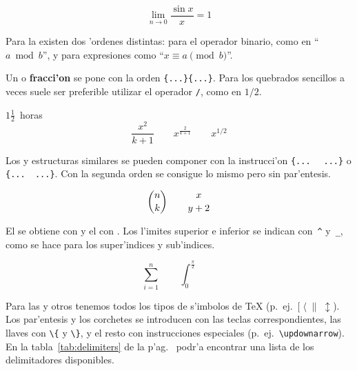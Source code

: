 \begin{example}
\[\lim_{n \rightarrow 0}
\frac{\sin x}{x}=1\]
\end{example}

Para la  existen dos 'ordenes distintas:
 para el operador binario, como en ``$a \bmod b$'', y
 para expresiones como ``$x\equiv a \pmod{b}$''.

Un \textbf{} o
\textbf{fracci'on} se pone con la orden
\verb|{...}{...}|. Para los quebrados sencillos a veces
suele ser preferible utilizar el operador \verb|/|, %
como en $1/2$.
\begin{example}
$1\frac{1}{2}$~horas
\begin{displaymath}
\frac{ x^{2} }{ k+1 }\qquad
x^{ \frac{2}{k+1} }\qquad
x^{ 1/2 }
\end{displaymath}
\end{example}

Los \textbf{} y estructuras similares
se pueden componer con la instrucci'on \verb|{... |%
\verb| ...}| o \verb|{... |\verb| ...}|. Con la segunda orden se
consigue lo mismo pero sin par'entesis.

\begin{example}
\begin{displaymath}
{n \choose k}\qquad {x \atop y+2}
\end{displaymath}
\end{example}
 
\medskip

El \textbf{} se obtiene con  y el
\textbf{} con . Los l'imites superior e
inferior se indican con~\verb|^| y~\verb|_|, como se hace para los
super'indices y sub'indices.

\begin{example}
\begin{displaymath}
\sum_{i=1}^{n} \qquad
\int_{0}^{\frac{\pi}{2}} \qquad
\end{displaymath}
\end{example}

Para las \textbf{} y otros  tenemos todos
los tipos de s'imbolos de \TeX{}
(p.~ej.~$[\;\langle\;\|\;\updownarrow$).  Los par'entesis y los
corchetes se introducen con las teclas correspondientes, las llaves
con \verb|\{| y \verb|\}|, y el resto con instrucciones especiales
(p.~ej.~\verb|\updownarrow|). En la tabla~\ref{tab:delimiters} de la
p'ag.~\pageref{tab:delimiters} podr'a encontrar una lista de los
delimitadores disponibles.


